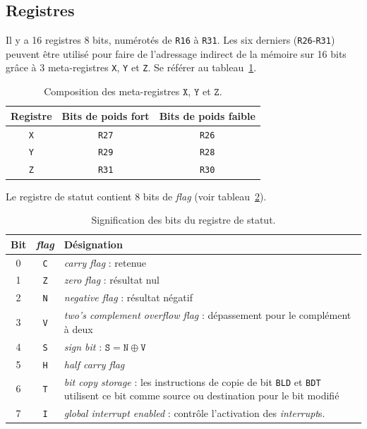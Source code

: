 \documentclass[11pt]{article}
\begin{document}
\subsection{Registres}\label{sec:registres}
Il y a 16 registres 8 bits, numérotés de \verb|R16| à \verb|R31|. Les
six derniers (\verb|R26|-\verb|R31|) peuvent être utilisé pour faire
de l'adressage indirect de la mémoire sur 16 bits grâce à 3 meta-registres \verb|X|, \verb|Y|
et \verb|Z|. Se référer au tableau~\ref{tab:meta-registres}.
\begin{table}[htbp]
  \centering
  \begin{tabular}{|c|c|c|}
\hline
    Registre & Bits de poids fort & Bits de poids faible \\
\hline
\hline
    \verb|X| & \verb|R27| & \verb|R26| \\
\hline
    \verb|Y| & \verb|R29| & \verb|R28| \\
\hline
    \verb|Z| & \verb|R31| & \verb|R30| \\
\hline
  \end{tabular}
  \caption{\label{tab:meta-registres}Composition des meta-registres
    $\texttt{X}$, $\texttt{Y}$ et $\texttt{Z}$.}

\end{table}

Le registre de statut contient 8 bits de \emph{flag} (voir
tableau~\ref{tab:status_register}).
\begin{table}[h!tbp]
  \centering
  \begin{tabular}{c c m{30em}}
    Bit & \emph{flag} & Désignation \\
\hline
    0 & \texttt{C} & \emph{carry flag} : retenue \\
    1 & \texttt{Z} & \emph{zero flag} : résultat nul \\
    2 & \texttt{N} & \emph{negative flag} : résultat négatif \\
    3 & \texttt{V} & \emph{two's complement overflow flag} : dépassement pour
            le complément à deux \\
    4 & \texttt{S} & \emph{sign bit} : $\mathtt{S} = \mathtt{N} \oplus
            \mathtt{V}$ \\
    5 & \texttt{H} & \emph{half carry flag} \\
    6 & \texttt{T} & \emph{bit copy storage} : les instructions de copie de bit
            \texttt{BLD} et \texttt{BDT} utilisent ce bit comme source
            ou destination pour le bit modifié \\
    7 & \texttt{I} & \emph{global interrupt enabled} : contrôle l'activation
            des \emph{interrupt}s.
  \end{tabular}
  \caption{\label{tab:status_register}Signification des bits du registre de statut.}
\end{table}
\end{document}
